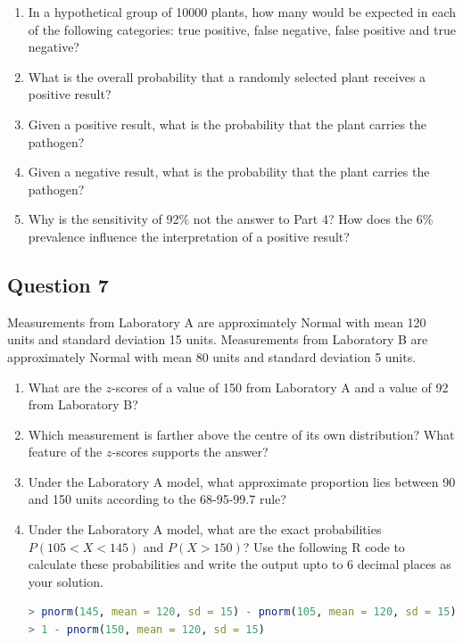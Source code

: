 \documentclass[10pt,letterpaper]{article}
\providecommand{\tightlist}{%
  \setlength{\itemsep}{0pt}\setlength{\parskip}{0pt}}
\begin{document}
\begin{enumerate}
\def\labelenumi{\arabic{enumi}.}
\tightlist
	\item In a hypothetical group of 10000 plants, how many would be expected in each of the following categories: true positive, false negative, false positive and true negative?
	\item What is the overall probability that a randomly selected plant receives a positive result?
	\item Given a positive result, what is the probability that the plant carries the pathogen?
	\item Given a negative result, what is the probability that the plant carries the pathogen?
	\item Why is the sensitivity of 92\% not the answer to Part 4? How does the 6\% prevalence influence the interpretation of a positive result?
\end{enumerate}

\subsection*{Question 7}
Measurements from Laboratory A are approximately Normal with mean 120 units and standard deviation 15 units. Measurements from Laboratory B are approximately Normal with mean 80 units and standard deviation 5 units.

\begin{enumerate}
\def\labelenumi{\arabic{enumi}.}
\tightlist
	\item What are the \(z\)-scores of a value of 150 from Laboratory A and a value of 92 from Laboratory B?
	\item Which measurement is farther above the centre of its own distribution? What feature of the \(z\)-scores supports the answer?
	\item Under the Laboratory A model, what approximate proportion lies between 90 and 150 units according to the 68-95-99.7 rule?
	\item Under the Laboratory A model, what are the exact probabilities \(P(105<X<145)\) and \(P(X>150)\)? Use the following R code to calculate these probabilities and write the output upto to 6 decimal places as your solution. 
\begin{lstlisting}[language=R]
> pnorm(145, mean = 120, sd = 15) - pnorm(105, mean = 120, sd = 15)
> 1 - pnorm(150, mean = 120, sd = 15)
\end{lstlisting}

\end{enumerate}
\end{document}
